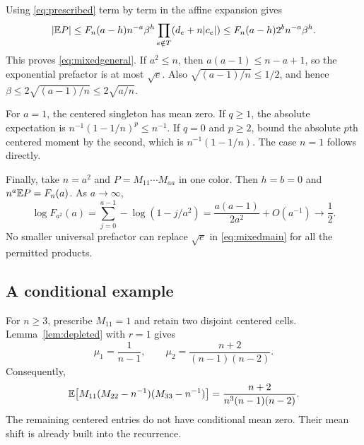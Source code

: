 Using \eqref{eq:prescribed} term by term in the affine expansion gives
\[
|\mathbb E P|\le F_n(a-h)n^{-a}\beta^h
\prod_{e\notin T}(d_e+n|c_e|)
\le F_n(a-h)2^bn^{-a}\beta^h.
\]
This proves \eqref{eq:mixedgeneral}. If $a^2\le n$, then $a(a-1)\le n-a+1$, so the exponential prefactor is at most $\sqrt e$. Also $\sqrt{(a-1)/n}\le1/2$, and hence $\beta\le2\sqrt{(a-1)/n}\le2\sqrt{a/n}$.

For $a=1$, the centered singleton has mean zero. If $q\ge1$, the absolute expectation is $n^{-1}(1-1/n)^p\le n^{-1}$. If $q=0$ and $p\ge2$, bound the absolute $p$th centered moment by the second, which is $n^{-1}(1-1/n)$. The case $n=1$ follows directly.

Finally, take $n=a^2$ and $P=M_{11}\cdots M_{aa}$ in one color. Then $h=b=0$ and $n^a\mathbb E P=F_n(a)$. As $a\to\infty$,
\[
\log F_{a^2}(a)=\sum_{j=0}^{a-1}-\log(1-j/a^2)
=\frac{a(a-1)}{2a^2}+O(a^{-1})\longrightarrow\frac12.
\]
No smaller universal prefactor can replace $\sqrt e$ in \eqref{eq:mixedmain} for all the permitted products.

\subsection{A conditional example}

For $n\ge3$, prescribe $M_{11}=1$ and retain two disjoint centered cells. Lemma~\ref{lem:depleted} with $r=1$ gives
\[
\mu_1=\frac1{n-1},\qquad
\mu_2=\frac{n+2}{(n-1)(n-2)}.
\]
Consequently,
\[
\mathbb E\bigl[M_{11}(M_{22}-n^{-1})(M_{33}-n^{-1})\bigr]
=\frac{n+2}{n^3(n-1)(n-2)}.
\]
The remaining centered entries do not have conditional mean zero. Their mean shift is already built into the recurrence.
